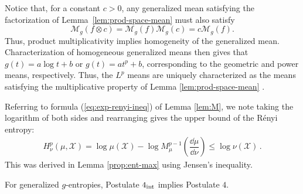 \documentclass[reqno]{amsart}
\begin{document}
\begin{remark}
\label{rem:multip-mean-char}
   Notice that, for a constant $c>0$, any generalized mean satisfying the factorization of Lemma~\ref{lem:prod-space-mean} must also satisfy
   $$
\mathcal{M}_g(f \otimes c) = \mathcal{M}_g(f ) \mathcal{M}_g( c) = c  \mathcal{M}_g(f ).
   $$
   Thus, product multiplicativity implies homogeneity of the generalized mean. Characterization of homogeneous generalized means then gives that 
   $g(t) = a \log t +b$ or $g(t) = a t^p +b$, corresponding to the geometric and power means, respectively.  
   Thus, the $L^p$ means are uniquely characterized as the means satisfying the multiplicative property of Lemma \ref{lem:prod-space-mean} \cite{FerPalPer08, AubNech11, Leinster12}. 
\end{remark}



\begin{remark}
\label{remark:ent-max}
Referring to formula (\ref{eq:exp-renyi-ineq}) of Lemma \ref{lem:M}, we note taking the logarithm of both sides and rearranging gives the upper bound of the Rényi entropy:
\begin{align*}
H_\nu^p(\mu, \mathcal{X}) = \log \mu(\mathcal{X}) -\log  M^{p-1}_\mu \left( \dfrac{\dd \mu}{\dd \nu}  \right) 
\leq \log \nu(\mathcal{X}) \, .
\end{align*}
This was derived in Lemma \ref{prop:ent-max} using Jensen's inequality.
\end{remark}





\begin{lem}
\label{lem:4int-4}
For generalized $g$-entropies, Postulate $4_{\rm int}$ implies Postulate $4$.
\end{lem}
\end{document}
